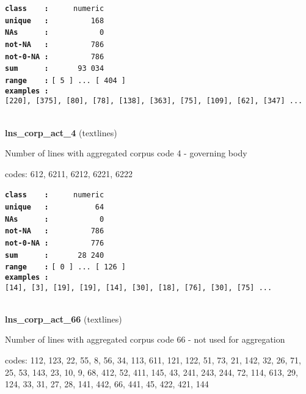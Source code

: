 \documentclass[]{article}
\begin{document}
\textbf{\texttt{class\ \ \ \ :}} \texttt{~~~~~numeric}\\
\textbf{\texttt{unique\ \ \ :}} \texttt{~~~~~~~~~168}\\
\textbf{\texttt{NAs\ \ \ \ \ \ :}} \texttt{~~~~~~~~~~~0}\\
\textbf{\texttt{not-NA\ \ \ :}} \texttt{~~~~~~~~~786}\\
\textbf{\texttt{not-0-NA\ :}} \texttt{~~~~~~~~~786}\\
\textbf{\texttt{sum\ \ \ \ \ \ :}} \texttt{~~~~~~93~034}\\
\textbf{\texttt{range\ \ \ \ :}}
\texttt{{[}\ 5\ {]}\ ...\ {[}\ 404\ {]}}\\
\textbf{\texttt{examples\ :}}
\texttt{{[}220{]},\ {[}375{]},\ {[}80{]},\ {[}78{]},\ {[}138{]},\ {[}363{]},\ {[}75{]},\ {[}109{]},\ {[}62{]},\ {[}347{]}\ ...}\\

~

\textbf{lns\_corp\_act\_4} (textlines)

Number of lines with aggregated corpus code 4 - governing body

codes: 612, 6211, 6212, 6221, 6222

\textbf{\texttt{class\ \ \ \ :}} \texttt{~~~~~numeric}\\
\textbf{\texttt{unique\ \ \ :}} \texttt{~~~~~~~~~~64}\\
\textbf{\texttt{NAs\ \ \ \ \ \ :}} \texttt{~~~~~~~~~~~0}\\
\textbf{\texttt{not-NA\ \ \ :}} \texttt{~~~~~~~~~786}\\
\textbf{\texttt{not-0-NA\ :}} \texttt{~~~~~~~~~776}\\
\textbf{\texttt{sum\ \ \ \ \ \ :}} \texttt{~~~~~~28~240}\\
\textbf{\texttt{range\ \ \ \ :}}
\texttt{{[}\ 0\ {]}\ ...\ {[}\ 126\ {]}}\\
\textbf{\texttt{examples\ :}}
\texttt{{[}14{]},\ {[}3{]},\ {[}19{]},\ {[}19{]},\ {[}14{]},\ {[}30{]},\ {[}18{]},\ {[}76{]},\ {[}30{]},\ {[}75{]}\ ...}\\

~

\textbf{lns\_corp\_act\_66} (textlines)

Number of lines with aggregated corpus code 66 - not used for
aggregation

codes: 112, 123, 22, 55, 8, 56, 34, 113, 611, 121, 122, 51, 73, 21, 142,
32, 26, 71, 25, 53, 143, 23, 10, 9, 68, 412, 52, 411, 145, 43, 241, 243,
244, 72, 114, 613, 29, 124, 33, 31, 27, 28, 141, 442, 66, 441, 45, 422,
421, 144
\end{document}
